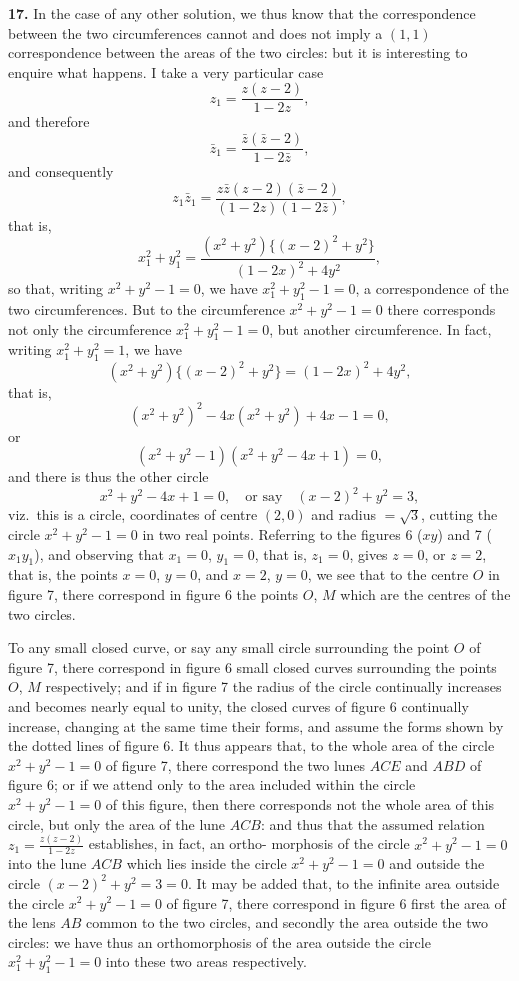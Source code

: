 \documentclass[11pt,a4paper]{book}
\begin{document}
{{{\textbf{17.} In the case of any other solution, we thus know that the correspondence
between the two circumferences cannot and does not imply a $(1, 1)$ correspondence
between the areas of the two circles: but it is interesting to enquire what happens.
I take a very particular case
\[
z_1 = \frac{z(z-2)}{1-2z},
\]
and therefore
\[
\bar{z}_1 = \frac{\bar{z}(\bar{z}-2)}{1-2\bar{z}},
\]
and consequently
\[
z_1\bar{z}_1 = \frac{z\bar{z}(z-2)(\bar{z}-2)}{(1-2z)(1-2\bar{z})},
\]
that is,
\[
x_1^2 + y_1^2 = \frac{(x^2+y^2)\{(x-2)^2+y^2\}}{(1-2x)^2+4y^2},
\]
so that, writing $x^2 + y^2 - 1 = 0$, we have $x_1^2 + y_1^2 - 1 = 0$, a correspondence of the two
circumferences. But to the circumference $x^2 + y^2 - 1 = 0$ there corresponds not only
the circumference $x_1^2 + y_1^2 - 1 = 0$, but another circumference. In fact, writing $x_1^2 + y_1^2 = 1$,
we have
\[
(x^2+y^2)\{(x-2)^2+y^2\} = (1-2x)^2 + 4y^2,
\]
that is,
\[
(x^2+y^2)^2 - 4x(x^2+y^2) + 4x - 1 = 0,
\]
or
\[
(x^2+y^2-1)(x^2+y^2-4x+1) = 0,
\]
and there is thus the other circle
\[
x^2+y^2-4x+1 = 0, \quad \text{or say} \quad (x-2)^2 + y^2 = 3,
\]
viz.~this is a circle, coordinates of centre $(2, 0)$ and radius $= \sqrt{3}$, cutting the circle
$x^2 + y^2 - 1 = 0$ in two real points. Referring to the figures 6 ($xy$) and 7 ($x_1y_1$), and
observing that $x_1 = 0$, $y_1 = 0$, that is, $z_1 = 0$, gives $z = 0$, or $z = 2$, that is, the points
$x = 0$, $y = 0$, and $x = 2$, $y = 0$, we see that to the centre $O$ in figure 7, there
correspond in figure 6 the points $O$, $M$ which are the centres of the two circles.

To any small closed curve, or say any small circle surrounding the point $O$ of
figure 7, there correspond in figure 6 small closed curves surrounding the points
$O$, $M$ respectively; and if in figure 7 the radius of the circle continually increases
and becomes nearly equal to unity, the closed curves of figure 6 continually increase,
changing at the same time their forms, and assume the forms shown by the dotted
lines of figure 6. It thus appears that, to the whole area of the circle $x^2 + y^2 - 1 = 0$
of figure 7, there correspond the two lunes $ACE$ and $ABD$ of figure 6; or if we
attend only to the area included within the circle $x^2 + y^2 - 1 = 0$ of this figure, then
there corresponds not the whole area of this circle, but only the area of the lune
$ACB$: and thus that the assumed relation $z_1 = \frac{z(z-2)}{1-2z}$ establishes, in fact, an ortho-\allowbreak
morphosis of the circle $x^2 + y^2 - 1 = 0$ into the lune $ACB$ which lies inside the circle
$x^2 + y^2 - 1 = 0$ and outside the circle $(x - 2)^2 + y^2 = 3 = 0$. It may be added that, to
the infinite area outside the circle $x^2 + y^2 - 1 = 0$ of figure 7, there correspond in
figure 6 first the area of the lens $AB$ common to the two circles, and secondly the
area outside the two circles: we have thus an orthomorphosis of the area outside
the circle $x_1^2 + y_1^2 - 1 = 0$ into these two areas respectively.

}}}
\end{document}
